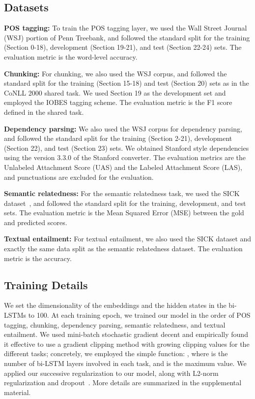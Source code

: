 \documentclass[11pt,a4paper]{article}
\begin{document}
\subsection{Datasets}
\label{subsec:datasets}

\noindent
{\bf POS tagging:}
To train the POS tagging layer, we used the Wall Street Journal (WSJ) portion of Penn Treebank, and followed the standard split for the training (Section 0-18), development (Section 19-21), and test (Section 22-24) sets.
The evaluation metric is the word-level accuracy.

\noindent
{\bf Chunking:}
For chunking, we also used the WSJ corpus, and followed the standard split for the training (Section 15-18) and test (Section 20) sets as in the CoNLL 2000 shared task.
We used Section 19 as the development set and employed the IOBES tagging scheme.
The evaluation metric is the F1 score defined in the shared task.

\noindent
{\bf Dependency parsing:}
We also used the WSJ corpus for dependency parsing, and followed the standard split for the training (Section 2-21), development (Section 22), and test (Section 23) sets.
We obtained Stanford style dependencies using the version 3.3.0 of the Stanford converter.
The evaluation metrics are the Unlabeled Attachment Score (UAS) and the Labeled Attachment Score (LAS), and punctuations are excluded for the evaluation.

\noindent
{\bf Semantic relatedness:}
For the semantic relatedness task, we used the SICK dataset~\citep{marelli2014}, and followed the standard split for the training, development, and test sets.
The evaluation metric is the Mean Squared Error (MSE) between the gold and predicted scores.

\noindent
{\bf Textual entailment:}
For textual entailment, we also used the SICK dataset and exactly the same data split as the semantic relatedness dataset.
The evaluation metric is the accuracy.

\subsection{Training Details}
\label{subsec:train_detail}
We set the dimensionality of the embeddings and the hidden states in the bi-LSTMs to 100.
At each training epoch, we trained our model in the order of POS tagging, chunking, dependency parsing, semantic relatedness, and textual entailment.
We used mini-batch stochastic gradient decent and empirically found it effective to use a gradient clipping method with growing clipping values for the different tasks; concretely, we employed the simple function: , where  is the number of bi-LSTM layers involved in each task, and  is the maximum value.
We applied our successive regularization to our model, along with L2-norm regularization and dropout~\citep{dropout2014ver}.
More details are summarized in the supplemental material.
\end{document}
